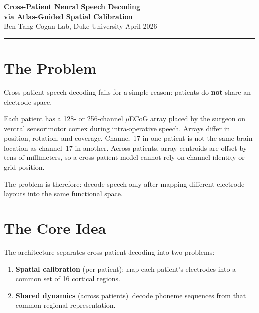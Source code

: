 \documentclass[12pt,letterpaper]{article}
\begin{document}
\begin{center}
{\LARGE\bfseries Cross-Patient Neural Speech Decoding\\[4pt]
via Atlas-Guided Spatial Calibration}\\[12pt]
{\normalsize Ben Tang \quad\textbar\quad Cogan Lab, Duke University \quad\textbar\quad April 2026}
\end{center}

\smallskip\noindent\rule{\textwidth}{0.4pt}\smallskip


\section{The Problem}

Cross-patient speech decoding fails for a simple reason: patients do \textbf{not} share an electrode space.

Each patient has a 128- or 256-channel $\mu$ECoG array placed by the surgeon on ventral sensorimotor cortex during intra-operative speech. Arrays differ in position, rotation, and coverage. Channel~17 in one patient is not the same brain location as channel~17 in another. Across patients, array centroids are offset by tens of millimeters, so a cross-patient model cannot rely on channel identity or grid position.

The problem is therefore: decode speech only after mapping different electrode layouts into the same functional space.


\section{The Core Idea}

The architecture separates cross-patient decoding into two problems:

\begin{enumerate}[leftmargin=2em, itemsep=0.15em]
\item \textbf{Spatial calibration} (per-patient): map each patient's electrodes into a common set of 16 cortical regions.
\item \textbf{Shared dynamics} (across patients): decode phoneme sequences from that common regional representation.
\end{enumerate}
\end{document}
